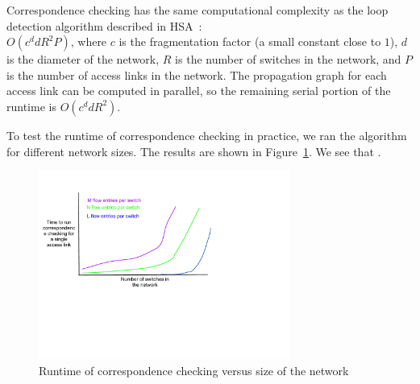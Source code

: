 
 Correspondence checking has
the same computational complexity as the loop detection algorithm described in
HSA~\cite{hsa}: \\
$O(c^{d}dR^{2}P)$, where $c$ is the fragmentation factor (a
small constant close to $1$), $d$ is the diameter of the network, $R$ is
the number of switches in the network, and $P$ is the number of access links
in the network. The propagation graph for each access link can be computed
in parallel, so the remaining serial portion of the runtime is $O(c^{d}dR^{2})$.

To test the runtime of correspondence checking in practice, we  ran the algorithm for different network sizes. The results are shown in
Figure~\ref{fig:hsa_runtime}. We see that .

\begin{figure}[t]
    \includegraphics[width=3.25in]{../graphs/mock_hsa_overhead.pdf}
    \caption[]{\label{fig:hsa_runtime} Runtime of correspondence checking
    versus size of the network}
\end{figure}

 
